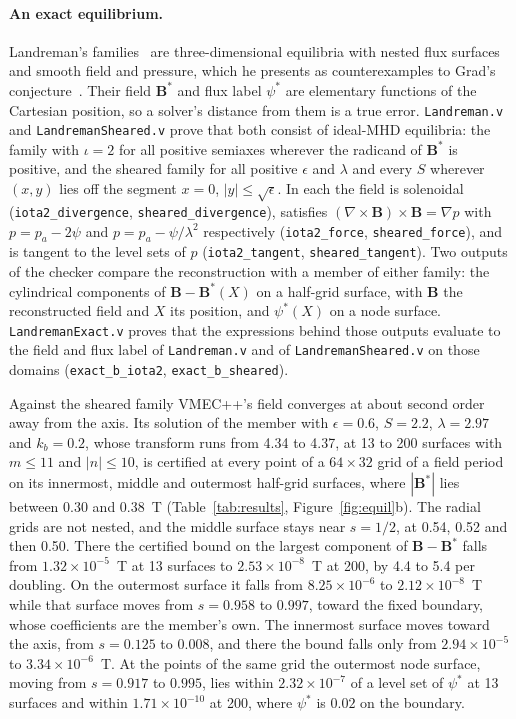 \documentclass[11pt]{article}
\newcommand{\code}[1]{\texttt{#1}}
\begin{document}
\paragraph{An exact equilibrium.}
Landreman's families~\cite{landreman2026} are three-dimensional equilibria with
nested flux surfaces and smooth field and pressure, which he presents as
counterexamples to Grad's conjecture~\cite{grad1967}. Their field $\mathbf{B}^*$
and flux label $\psi^*$ are elementary functions of the Cartesian position, so a
solver's distance from them is a true error. \code{Landreman.v} and
\code{LandremanSheared.v} prove that both consist of ideal-MHD equilibria: the
family with $\iota=2$ for all positive semiaxes wherever the radicand of
$\mathbf{B}^*$ is positive, and the sheared family for all positive $\epsilon$
and $\lambda$ and every $S$ wherever $(x,y)$ lies off the segment $x=0$,
$|y|\le\sqrt{\epsilon}$. In each the field is solenoidal
(\code{iota2\_divergence}, \code{sheared\_divergence}), satisfies
$(\nabla\times\mathbf{B})\times\mathbf{B}=\nabla p$ with $p=p_a-2\psi$ and
$p=p_a-\psi/\lambda^2$ respectively (\code{iota2\_force},
\code{sheared\_force}), and is tangent to the level sets of $p$
(\code{iota2\_tangent}, \code{sheared\_tangent}). Two outputs of the checker
compare the reconstruction with a member of either family: the cylindrical
components of $\mathbf{B}-\mathbf{B}^*(X)$ on a half-grid surface, with
$\mathbf{B}$ the reconstructed field and $X$ its position, and $\psi^*(X)$ on a
node surface. \code{LandremanExact.v} proves that the expressions behind those
outputs evaluate to the field and flux label of \code{Landreman.v} and of
\code{LandremanSheared.v} on those domains (\code{exact\_b\_iota2},
\code{exact\_b\_sheared}).

Against the sheared family VMEC++'s field converges at about second order away
from the axis. Its solution of the member with $\epsilon=0.6$, $S=2.2$,
$\lambda=2.97$ and $k_b=0.2$, whose transform runs from 4.34 to 4.37, at 13 to
200 surfaces with $m\le11$ and $|n|\le10$, is certified at every point of a
$64\times32$ grid of a field period on its innermost, middle and outermost
half-grid surfaces, where $|\mathbf{B}^*|$ lies between 0.30 and 0.38~T
(Table~\ref{tab:results}, Figure~\ref{fig:equil}b). The radial grids are not
nested, and the middle surface stays near $s=1/2$, at 0.54, 0.52 and then 0.50.
There the certified bound on the largest component of
$\mathbf{B}-\mathbf{B}^*$ falls from $1.32\times10^{-5}$~T at 13 surfaces to
$2.53\times10^{-8}$~T at 200, by 4.4 to 5.4 per doubling. On the outermost
surface it falls from $8.25\times10^{-6}$ to $2.12\times10^{-8}$~T while that
surface moves from $s=0.958$ to $0.997$, toward the fixed boundary, whose
coefficients are the member's own. The innermost surface moves toward the axis,
from $s=0.125$ to $0.008$, and there the bound falls only from
$2.94\times10^{-5}$ to $3.34\times10^{-6}$~T. At the points of the same grid
the outermost node surface, moving from $s=0.917$ to $0.995$, lies within
$2.32\times10^{-7}$ of a level set of $\psi^*$ at 13 surfaces and within
$1.71\times10^{-10}$ at 200, where $\psi^*$ is $0.02$ on the boundary.
\end{document}
